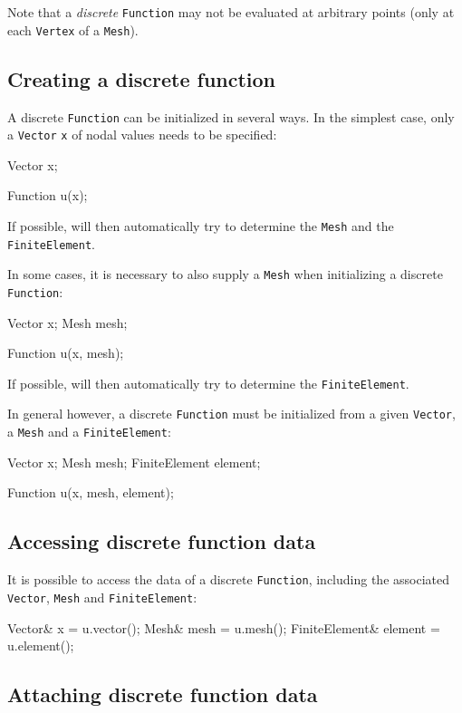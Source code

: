Note that a \emph{discrete} \texttt{Function} may not be evaluated at
arbitrary points (only at each \texttt{Vertex} of a \texttt{Mesh}).

\subsection{Creating a discrete function}

A discrete \texttt{Function} can be initialized in several ways.
In the simplest case, only a \texttt{Vector} \texttt{x} of nodal
values needs to be specified:
\begin{code}
Vector x;

Function u(x);
\end{code}
If possible, \dolfin{} will then automatically try to determine the
\texttt{Mesh} and the \texttt{FiniteElement}.

In some cases, it is necessary to also supply a \texttt{Mesh}
when initializing a discrete \texttt{Function}:
\begin{code}
Vector x;
Mesh mesh;

Function u(x, mesh);
\end{code}
If possible, \dolfin{} will then automatically try to determine the
\texttt{FiniteElement}.

In general however, a discrete \texttt{Function} must be initialized
from a given \texttt{Vector}, a \texttt{Mesh}
and a \texttt{FiniteElement}:
\begin{code}
Vector x;
Mesh mesh;
FiniteElement element;

Function u(x, mesh, element);
\end{code}

\subsection{Accessing discrete function data}

It is possible to access the data of a discrete \texttt{Function},
including the associated \texttt{Vector}, \texttt{Mesh}
and \texttt{FiniteElement}:
\begin{code}
Vector& x              = u.vector();
Mesh& mesh             = u.mesh();
FiniteElement& element = u.element();
\end{code}

\subsection{Attaching discrete function data}

